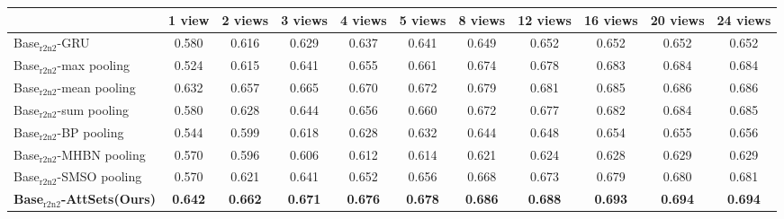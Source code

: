 \documentclass[twocolumn]{svjour3}    \pdfoutput=1
\newcommand{\nickname}{AttSets}
\begin{document}
\begin{table*}[t]
\caption{Group 2: mean IoU for multi-view reconstruction of all 13 categories in ShapeNet$_{\textrm{r2n2}}$ testing split. All networks are firstly trained given only 1 image for each object in Stage 1. The \nickname{} module is further trained given \textbf{8 images} per object in Stage 2, while other competing approaches are fine-tuned given \textbf{8 images} per object in Stage 2.}
\centering
\label{tab:iou_r2n2_08v}
\tabcolsep=0.125cm
\begin{tabular}{ l|cccccccccc}
\hline
&1 view&2 views&3 views& 4 views&5 views&8 views&12 views&16 views&20 views&24 views \\
\hline
Base$_{\textrm{r2n2}}$-GRU &0.580&0.616&0.629&0.637&0.641&0.649&0.652&0.652&0.652&0.652 \\
Base$_{\textrm{r2n2}}$-max pooling &0.524&0.615&0.641&0.655&0.661&0.674&0.678&0.683&0.684&0.684 \\
Base$_{\textrm{r2n2}}$-mean pooling &0.632&0.657&0.665&0.670&0.672&0.679&0.681&0.685&0.686&0.686 \\
Base$_{\textrm{r2n2}}$-sum pooling &0.580&0.628&0.644&0.656&0.660&0.672&0.677&0.682&0.684&0.685 \\
Base$_{\textrm{r2n2}}$-BP pooling &0.544&0.599&0.618&0.628&0.632&0.644&0.648&0.654&0.655&0.656 \\
Base$_{\textrm{r2n2}}$-MHBN pooling &0.570&0.596&0.606&0.612&0.614&0.621&0.624&0.628&0.629&0.629 \\
Base$_{\textrm{r2n2}}$-SMSO pooling &0.570&0.621&0.641&0.652&0.656&0.668&0.673&0.679&0.680&0.681 \\
\textbf{Base$_{\textrm{r2n2}}$-\nickname{}(Ours)} &\textbf{0.642}&\textbf{0.662}&\textbf{0.671}&\textbf{0.676}&\textbf{0.678}&\textbf{0.686}
&\textbf{0.688}&\textbf{0.693}&\textbf{0.694}&\textbf{0.694} \\
\hline
\end{tabular}
\vspace{-0.1 cm}
\end{table*}
\end{document}
